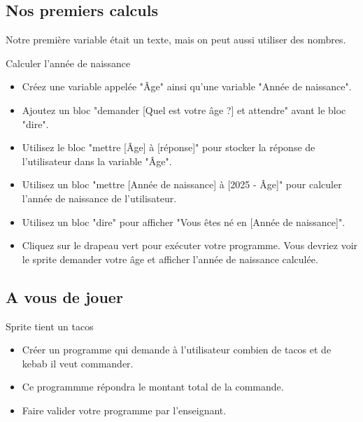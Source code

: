 \subsection{Nos premiers calculs}
Notre première variable était un texte, mais on peut aussi utiliser des nombres.
\begin{UPSTIManipulation}{Calculer l'année de naissance}
    \begin{itemize}[label=$\square$]
        \item Créez une variable appelée "Âge" ainsi qu'une variable "Année de naissance".
        \item Ajoutez un bloc "demander [Quel est votre âge ?] et attendre" avant le bloc "dire".
        \item Utilisez le bloc "mettre [Âge] à [réponse]" pour stocker la réponse de l'utilisateur dans la variable "Âge".
        \item Utilisez un bloc "mettre [Année de naissance] à [2025 - Âge]" pour calculer l'année de naissance de l'utilisateur.
        \item Utilisez un bloc "dire" pour afficher "Vous êtes né en [Année de naissance]".
        \item Cliquez sur le drapeau vert pour exécuter votre programme. Vous devriez voir le sprite demander votre âge et afficher l'année de naissance calculée.
    \end{itemize}
\end{UPSTIManipulation}

\subsection{A vous de jouer}

\begin{UPSTIManipulation}{Sprite tient un tacos}
    \begin{itemize}[label=$\square$]
    \item Créer un programme qui demande à l'utilisateur combien de tacos et de kebab il veut commander. 
    \item Ce programmme répondra le montant total de la commande.
    \item Faire valider votre programme par l'enseignant.
    \end{itemize}
\end{UPSTIManipulation}
